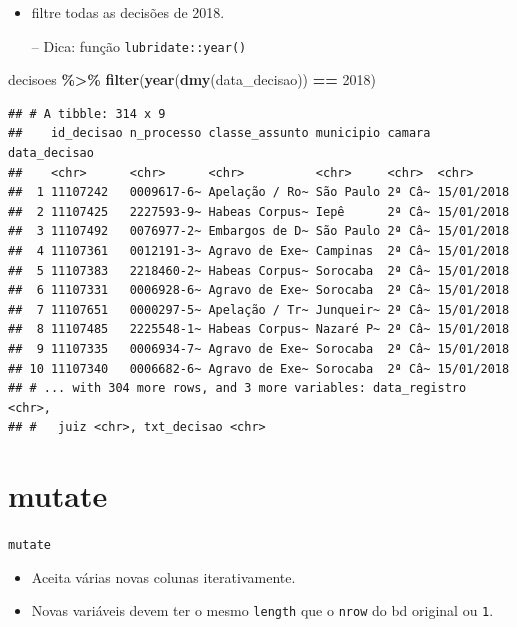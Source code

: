 \documentclass[
  10pt,
  ignorenonframetext,
]{beamer}
\newenvironment{Shaded}{\begin{snugshade}}{\end{snugshade}}
\newcommand{\DecValTok}[1]{\textcolor[rgb]{0.00,0.00,0.81}{#1}}
\newcommand{\KeywordTok}[1]{\textcolor[rgb]{0.13,0.29,0.53}{\textbf{#1}}}
\newcommand{\NormalTok}[1]{#1}
\newcommand{\OperatorTok}[1]{\textcolor[rgb]{0.81,0.36,0.00}{\textbf{#1}}}
\newcommand{\StringTok}[1]{\textcolor[rgb]{0.31,0.60,0.02}{#1}}
\begin{document}
\begin{frame}[fragile]{}
\protect\hypertarget{section-1}{}
\begin{itemize}
\item
  filtre todas as decisões de 2018.

  -- Dica: função \texttt{lubridate::year()}
\end{itemize}

\begin{Shaded}
\begin{Highlighting}[]
\NormalTok{decisoes }\OperatorTok{\%\textgreater{}\%}\StringTok{ }
\StringTok{  }\KeywordTok{filter}\NormalTok{(}\KeywordTok{year}\NormalTok{(}\KeywordTok{dmy}\NormalTok{(data\_decisao)) }\OperatorTok{==}\StringTok{ }\DecValTok{2018}\NormalTok{)}
\end{Highlighting}
\end{Shaded}

\begin{verbatim}
## # A tibble: 314 x 9
##    id_decisao n_processo classe_assunto municipio camara data_decisao
##    <chr>      <chr>      <chr>          <chr>     <chr>  <chr>       
##  1 11107242   0009617-6~ Apelação / Ro~ São Paulo 2ª Câ~ 15/01/2018  
##  2 11107425   2227593-9~ Habeas Corpus~ Iepê      2ª Câ~ 15/01/2018  
##  3 11107492   0076977-2~ Embargos de D~ São Paulo 2ª Câ~ 15/01/2018  
##  4 11107361   0012191-3~ Agravo de Exe~ Campinas  2ª Câ~ 15/01/2018  
##  5 11107383   2218460-2~ Habeas Corpus~ Sorocaba  2ª Câ~ 15/01/2018  
##  6 11107331   0006928-6~ Agravo de Exe~ Sorocaba  2ª Câ~ 15/01/2018  
##  7 11107651   0000297-5~ Apelação / Tr~ Junqueir~ 2ª Câ~ 15/01/2018  
##  8 11107485   2225548-1~ Habeas Corpus~ Nazaré P~ 2ª Câ~ 15/01/2018  
##  9 11107335   0006934-7~ Agravo de Exe~ Sorocaba  2ª Câ~ 15/01/2018  
## 10 11107340   0006682-6~ Agravo de Exe~ Sorocaba  2ª Câ~ 15/01/2018  
## # ... with 304 more rows, and 3 more variables: data_registro <chr>,
## #   juiz <chr>, txt_decisao <chr>
\end{verbatim}
\end{frame}

\hypertarget{mutate}{%
\section{mutate}\label{mutate}}

\begin{frame}[fragile]{\texttt{mutate}}
\protect\hypertarget{mutate-1}{}
\begin{itemize}
\item
  Aceita várias novas colunas iterativamente.
\item
  Novas variáveis devem ter o mesmo \texttt{length} que o \texttt{nrow}
  do bd original ou \texttt{1}.
\end{itemize}
\end{frame}
\end{document}
